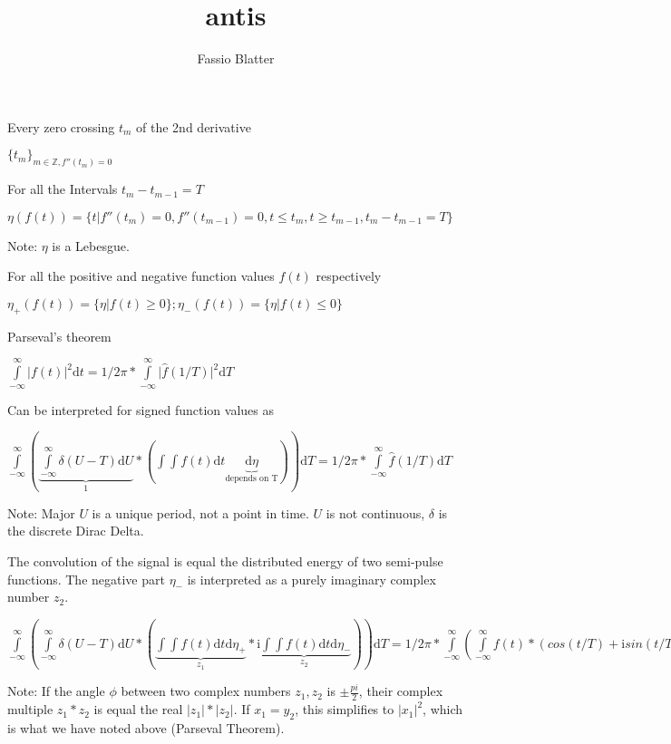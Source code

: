 \documentclass{article}
\renewcommand{\baselinestretch}{2}
\begin{document}
\title{antis}
\author{Fassio Blatter}

\maketitle


\renewcommand{\baselinestretch}{2}

Every zero crossing $t_{m}$ of the 2nd derivative

$\{t_{m}\}_{m \in \mathbb{Z} , f''(t_{m})=0}$

For all the Intervals $t_{m}-t_{m-1}=T$

$\eta(f(t))=\{t \vert f''(t_{m})=0, f''(t_{m-1})=0, t \le t_{m}, t \ge t_{m-1}, t_{m} - t_{m-1}=T \}$

Note: $\eta$ is a Lebesgue.

For all the positive and negative function values $f(t)$ respectively

$\eta_{+}(f(t))=\{{\eta \vert f(t) \ge 0}\}; \eta_{-}(f(t))=\{{\eta \vert f(t) \le 0}\}$

Parseval's theorem

$\int\limits_{-\infty}^{\infty} \vert f(t) \vert ^2 \mathrm{d} t = 1/2\pi * \int\limits_{-\infty}^{\infty} \vert \hat{f}(1/T) \vert ^2  \mathrm{d} T$

Can be interpreted for signed function values as

$\int\limits_{-\infty}^{\infty} (\underbrace{\int\limits_{-\infty}^{\infty} \delta (U - T) \mathrm{d} U}_{1} * (\int\int f(t) \mathrm{d} t \underbrace{\mathrm{d} \eta}_{\text{depends on T}}) )\mathrm{d} T = 1/2\pi * \int\limits_{-\infty}^{\infty} \hat{f}(1/T) \mathrm{d} T$

Note: Major $U$ is a unique period, not a point in time. $U$ is not continuous, $\delta$ is the discrete Dirac Delta.

The convolution of the signal is equal the distributed energy of two semi-pulse functions. The negative part $\eta_{-}$ is interpreted as a purely imaginary complex number $z_{2}$.

$\int\limits_{-\infty}^{\infty}(\int\limits_{-\infty}^{\infty} \delta (U - T) \mathrm{d} U * (\underbrace{\int \int f(t) \mathrm{d} t \mathrm{d} \eta_{+}}_{z_{1}} * \underbrace{\mathrm{i} \int \int f(t) \mathrm{d} t \mathrm{d} \eta_{-}}_{z_{2}}))  \mathrm{d} T = 1/2\pi * \int\limits_{-\infty}^{\infty} ( \int\limits_{-\infty}^{\infty}  f(t) * (cos(t/T)+\mathrm{i} sin(t/T)) \mathrm{d} t ) \mathrm{d} T$

Note: If the angle $\phi$ between two complex numbers $z_{1},z_{2}$ is $\pm\frac{pi}{2}$, their complex multiple $z_{1}*z_{2}$ is equal the real $\lvert z_{1}\rvert*\lvert z_{2}\rvert$. If $x_{1}=y_{2}$, this simplifies to $\lvert x_{1} \rvert ^2$, which is what we have noted above (Parseval Theorem).
\end{document}

